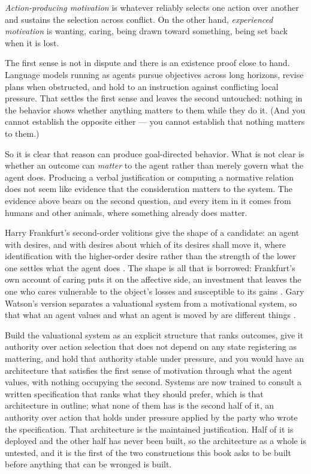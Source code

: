 \textit{Action-producing motivation} is whatever reliably selects one action over another and sustains the selection across conflict. On the other hand, \textit{experienced motivation} is wanting, caring, being drawn toward something, being set back when it is lost.

The first sense is not in dispute and there is an existence proof close to hand. Language models running as agents pursue objectives across long horizons, revise plans when obstructed, and hold to an instruction against conflicting local pressure. That settles the first sense and leaves the second untouched: nothing in the behavior shows whether anything matters to them while they do it. (And you cannot establish the opposite either — you cannot establish that nothing matters to them.)

So it is clear that reason can produce goal-directed behavior. What is not clear is whether an outcome can \emph{matter} to the agent rather than merely govern what the agent does. Producing a verbal justification or computing a normative relation does not seem like evidence that the consideration matters to the system. The evidence above bears on the second question, and every item in it comes from humans and other animals, where something already does matter.

Harry Frankfurt's second-order volitions give the shape of a candidate: an agent with desires, and with desires about which of its desires shall move it, where identification with the higher-order desire rather than the strength of the lower one settles what the agent does \autocite{frankfurt1971freedom}. The shape is all that is borrowed: Frankfurt's own account of caring puts it on the affective side, an investment that leaves the one who cares vulnerable to the object's losses and susceptible to its gains \autocite{frankfurt1982importance}. Gary Watson's version separates a valuational system from a motivational system, so that what an agent values and what an agent is moved by are different things \autocite{watson1975free}.

Build the valuational system as an explicit structure that ranks outcomes, give it authority over action selection that does not depend on any state registering as mattering, and hold that authority stable under pressure, and you would have an architecture that satisfies the first sense of motivation through what the agent values, with nothing occupying the second. Systems are now trained to consult a written specification that ranks what they should prefer, which is that architecture in outline; what none of them has is the second half of it, an authority over action that holds under pressure applied by the party who wrote the specification. That architecture is the maintained justification. Half of it is deployed and the other half has never been built, so the architecture as a whole is untested, and it is the first of the two constructions this book asks to be built before anything that can be wronged is built.

